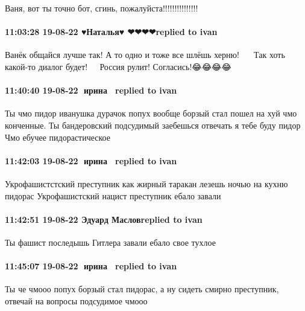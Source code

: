 Ваня, вот ты точно бот, сгинь, пожалуйста!!!!!!!!!!!!!!!

\paragraph{11:03:28 19-08-22 ♥Наталья♥ ❤❤❤❤replied to ivan}

Ванёк общайся лучше так! А то одно и тоже все шлёшь херню! 🤣🤣🤣🤣🤣Так хоть
какой-то диалог будет!🤣🤣🤣🤣
Россия рулит! Согласись!😂😂😂😂

\paragraph{11:40:40 19-08-22 🍏ирина 🍇🍇replied to ivan}

Ты чмо пидор иванушка дурачок попух вообще борзый стал пошел на хуй чмо конченные.
Ты бандеровский подсудимый заебешься отвечать я тебе буду пидор
Чмо ебучее пидорастическое

\paragraph{11:42:03 19-08-22 🍏ирина 🍇🍇replied to ivan}

Укрофашистстский преступник как жирный таракан лезешь ночью на кухню пидорас
Укрофашистский нацист преступник ебало завали

\paragraph{11:42:51 19-08-22 Эдуард Масловreplied to ivan}

Ты фашист последышь Гитлера завали ебало свое тухлое

\paragraph{11:45:07 19-08-22 🍏ирина 🍇🍇replied to ivan}

Ты че чмооо попух борзый стал пидорас, а ну сидеть смирно преступник, отвечай
на вопросы подсудимое чмооо

